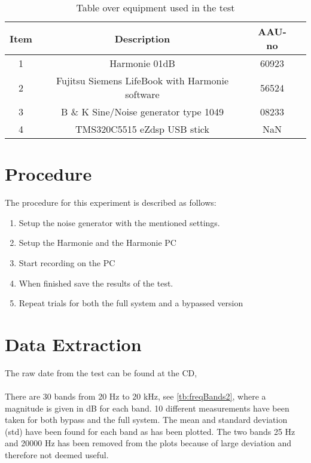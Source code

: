 \begin{table}[H]
\centering
{}
\begin{tabular}{S[table-format=1]ccc} \toprule
    {Item} & {Description} & {AAU-no} \\       &  Harmonie 01dB  & 60923  \\ 
    2      &  Fujitsu Siemens LifeBook with Harmonie software  & 56524  \\ 
    3      &  B \& K Sine/Noise generator type 1049  & 08233  \\ 
    4      &  TMS320C5515 eZdsp USB stick  & NaN  \\  \bottomrule 
\end{tabular}
\caption{Table over equipment used in the test}
\label{tab:UsedEquipmentFreqResponseActual}
\end{table}
\vspace{-5mm}


\section{Procedure}
The procedure for this experiment is described as follows:
\vspace{-5mm}
\begin{enumerate}\addtolength{\itemsep}{-.35\baselineskip} 
\item Setup the noise generator with the mentioned settings.
\item Setup the Harmonie and the Harmonie PC
\item Start recording on the PC
\item When finished save the results of the test.
\item Repeat trials for both the full system and a bypassed version
\end{enumerate}

\section{Data Extraction}
The raw date from the test can be found at the CD, \\ 
\\
There are 30 bands from 20 Hz to 20 kHz, see \autoref{tb:freqBands2}, where a magnitude is given in dB for each band. 10 different measurements have been taken for both bypass and the full system. The mean and standard deviation (std) have been found for each band as has been plotted. The two bands 25 Hz and 20000 Hz has been removed from the plots because of large deviation and therefore not deemed useful.

